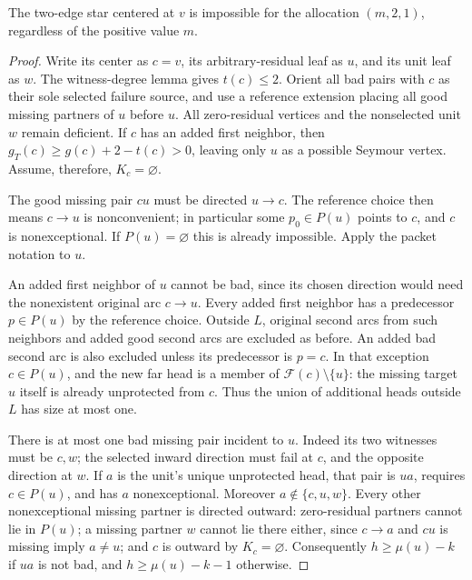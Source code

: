 \begin{lemma}
\label{lem:two-centered-star-three-two-one}
The two-edge star centered at $v$ is impossible for the allocation
$(m,2,1)$, regardless of the positive value $m$.
\end{lemma}
\begin{proof}
Write its center as $c=v$, its arbitrary-residual leaf as $u$, and its
unit leaf as $w$.  The witness-degree lemma gives $t(c)\le2$.  Orient
all bad pairs with $c$ as their sole selected failure source, and use
a reference extension placing all good missing partners of $u$ before
$u$.  All zero-residual vertices and the nonselected unit $w$ remain
deficient.  If $c$ has an added first neighbor, then
$g_T(c)\ge g(c)+2-t(c)>0$, leaving only $u$ as a possible Seymour
vertex.  Assume, therefore, $K_c=\varnothing$.

The good missing pair $cu$ must be directed $u\to c$.  The reference
choice then means $c\to u$ is nonconvenient; in particular some
$p_0\in P(u)$ points to $c$, and $c$ is nonexceptional.
If $P(u)=\varnothing$ this is already impossible.  Apply the packet
notation to $u$.

An added first neighbor of $u$ cannot be bad, since its chosen
direction would need the nonexistent original arc $c\to u$.
Every added first neighbor has a predecessor $p\in P(u)$ by the
reference choice.  Outside $L$, original second arcs from such
neighbors and added good second arcs are excluded as before.
An added bad second arc is also excluded unless its predecessor is
$p=c$.  In that exception $c\in P(u)$, and the new far head is a
member of $\mathcal F(c)\setminus\{u\}$: the missing target $u$
itself is already unprotected from $c$.  Thus the union of additional
heads outside $L$ has size at most one.

There is at most one bad missing pair incident to $u$.  Indeed its
two witnesses must be $c,w$; the selected inward direction must fail
at $c$, and the opposite direction at $w$.  If $a$ is the unit's
unique unprotected head, that pair is $ua$, requires $c\in P(u)$,
and has $a$ nonexceptional.  Moreover $a\notin\{c,u,w\}$.
Every other nonexceptional missing partner is directed outward:
zero-residual partners cannot lie in $P(u)$; a missing partner $w$
cannot lie there either, since $c\to a$ and $cu$ is missing imply
$a\ne u$; and $c$ is outward by $K_c=\varnothing$.
Consequently $h\ge\mu(u)-k$ if $ua$ is not bad, and
$h\ge\mu(u)-k-1$ otherwise.


\end{proof}
